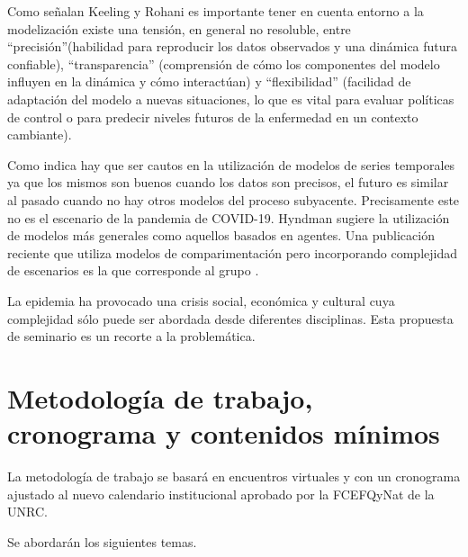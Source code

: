 \documentclass{article}
\begin{document}
 
  Como señalan Keeling y Rohani \cite{KR}   es importante tener en cuenta entorno a  la modelización  existe una tensión, en general no resoluble, entre ``precisión''(habilidad para reproducir los datos observados y una dinámica futura confiable),  ``transparencia'' (comprensión de cómo los componentes del modelo influyen en la dinámica y cómo interactúan)  y  ``flexibilidad'' (facilidad de adaptación del modelo a nuevas situaciones, lo que es vital para evaluar políticas de control o para predecir niveles futuros de la enfermedad en un contexto cambiante).
 
 
 Como indica \cite{hyn1} hay que ser cautos en la utilización de modelos de series temporales ya que los mismos son buenos cuando los datos son precisos, el futuro es similar al pasado cuando no hay otros modelos del proceso subyacente. Precisamente este no es el escenario de la pandemia de COVID-19. Hyndman sugiere la utilización de modelos más generales como aquellos  basados en agentes. Una publicación reciente que utiliza modelos de comparimentación pero incorporando complejidad de escenarios es la que corresponde al grupo \cite{fergu2020}. 
 
 La epidemia ha provocado una crisis social, económica y cultural cuya complejidad sólo puede ser abordada desde diferentes disciplinas. Esta propuesta de seminario es un recorte a la problemática.
 
 
	
	


\section{Metodología de trabajo, cronograma y  contenidos mínimos} \label{metocrono}

La metodología de trabajo se basará en encuentros virtuales y con un cronograma ajustado al nuevo calendario institucional aprobado por la FCEFQyNat de la UNRC.



Se abordarán los siguientes temas. 
\end{document}
